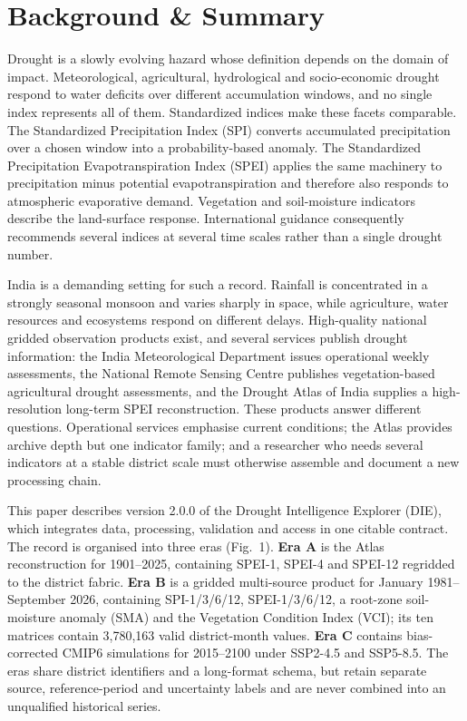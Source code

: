 \documentclass[10pt,a4paper]{article}
\begin{document}
\section*{Background \& Summary}
Drought is a slowly evolving hazard whose definition depends on the domain of impact. Meteorological, agricultural, hydrological and socio-economic drought respond to water deficits over different accumulation windows, and no single index represents all of them\citep{WilhiteGlantz1985,MishraSingh2010}. Standardized indices make these facets comparable. The Standardized Precipitation Index (SPI) converts accumulated precipitation over a chosen window into a probability-based anomaly\citep{McKee1993}. The Standardized Precipitation Evapotranspiration Index (SPEI) applies the same machinery to precipitation minus potential evapotranspiration and therefore also responds to atmospheric evaporative demand\citep{VicenteSerrano2010}. Vegetation and soil-moisture indicators describe the land-surface response\citep{Kogan1995}. International guidance consequently recommends several indices at several time scales rather than a single drought number\citep{WMOLincoln2009,SvobodaFuchs2016}.

India is a demanding setting for such a record. Rainfall is concentrated in a strongly seasonal monsoon and varies sharply in space, while agriculture, water resources and ecosystems respond on different delays\citep{GadgilGadgil2006}. High-quality national gridded observation products exist\citep{Pai2014,Srivastava2009}, and several services publish drought information: the India Meteorological Department issues operational weekly assessments, the National Remote Sensing Centre publishes vegetation-based agricultural drought assessments, and the Drought Atlas of India supplies a high-resolution long-term SPEI reconstruction\citep{Chuphal2024,ChuphalData2024}. These products answer different questions. Operational services emphasise current conditions; the Atlas provides archive depth but one indicator family; and a researcher who needs several indicators at a stable district scale must otherwise assemble and document a new processing chain.

This paper describes version 2.0.0 of the Drought Intelligence Explorer (DIE), which integrates data, processing, validation and access in one citable contract. The record is organised into three eras (Fig.~1). \textbf{Era A} is the Atlas reconstruction for 1901--2025, containing SPEI-1, SPEI-4 and SPEI-12 regridded to the district fabric. \textbf{Era B} is a gridded multi-source product for January 1981--September 2026, containing SPI-1/3/6/12, SPEI-1/3/6/12, a root-zone soil-moisture anomaly (SMA) and the Vegetation Condition Index (VCI); its ten matrices contain 3,780,163 valid district-month values. \textbf{Era C} contains bias-corrected CMIP6 simulations for 2015--2100 under SSP2-4.5 and SSP5-8.5. The eras share district identifiers and a long-format schema, but retain separate source, reference-period and uncertainty labels and are never combined into an unqualified historical series.
\end{document}
